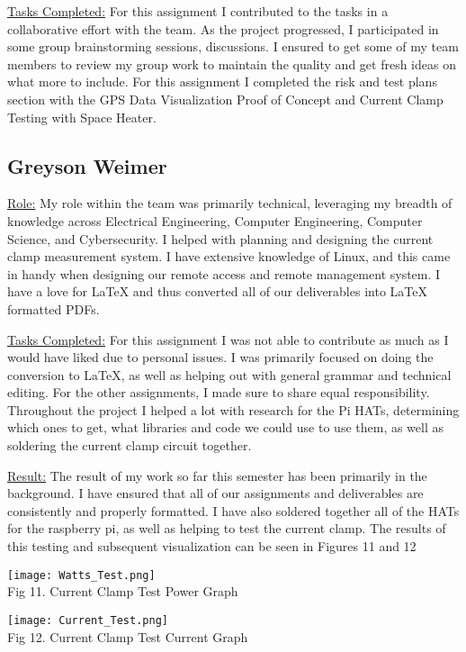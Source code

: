 \underline{Tasks Completed:} For this assignment I contributed to the tasks in a collaborative effort with the team. 
As the project progressed, I participated in some group brainstorming sessions, discussions. 
I ensured to get some of my team members to review my group work to maintain the quality and get fresh ideas on what more to include. 
For this assignment I completed the risk and test plans section with the GPS Data Visualization Proof of Concept and Current Clamp Testing with Space Heater.

\subsection{Greyson Weimer}
\underline{Role:} My role within the team was primarily technical, leveraging my breadth of knowledge across Electrical Engineering, Computer Engineering, Computer Science, and Cybersecurity.
I helped with planning and designing the current clamp measurement system.
I have extensive knowledge of Linux, and this came in handy when designing our remote access and remote management system.
I have a love for LaTeX and thus converted all of our deliverables into LaTeX formatted PDFs.

\underline{Tasks Completed:} For this assignment I was not able to contribute as much as I would have liked due to personal issues.
I was primarily focused on doing the conversion to LaTeX, as well as helping out with general grammar and technical editing.
For the other assignments, I made sure to share equal responsibility.
Throughout the project I helped a lot with research for the Pi HATs, determining which ones to get, what libraries and code we could use to use them, as well as soldering the current clamp circuit together.

\underline{Result:} The result of my work so far this semester has been primarily in the background.
I have ensured that all of our assignments and deliverables are consistently and properly formatted.
I have also soldered together all of the HATs for the raspberry pi, as well as helping to test the current clamp.
The results of this testing and subsequent visualization can be seen in Figures 11 and 12

\begin{center}
    \texttt{[image: Watts\_Test.png]}\\
    Fig 11. Current Clamp Test Power Graph
\end{center}

\begin{center}
    \texttt{[image: Current\_Test.png]}\\
    Fig 12. Current Clamp Test Current Graph
\end{center}